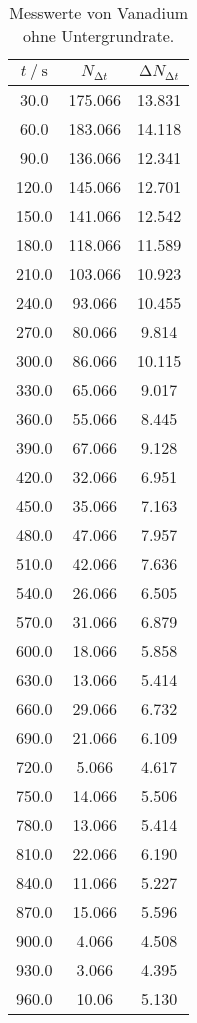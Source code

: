 \begin{table}
 \centering
 \caption{Messwerte von Vanadium ohne Untergrundrate.}
 \label{tab:vanwahr}
 \begin{tabular}{c c c}
  \toprule
  {$t \mathbin{/} \si{\s}$} & {$N_{\increment t}$} & {$\increment N_{\increment t}$}\\
  \midrule
  30.0    & 175.066  & 13.831  \\
  60.0    & 183.066 & 14.118  \\
  90.0    & 136.066  & 12.341  \\
  120.0   & 145.066  & 12.701  \\
  150.0   & 141.066  & 12.542  \\
  180.0   & 118.066  & 11.589  \\
  210.0   & 103.066  & 10.923  \\
  240.0   & 93.066  & 10.455  \\
  270.0   & 80.066  & 9.814  \\
  300.0   & 86.066  & 10.115  \\
  330.0   & 65.066  & 9.017\\
  360.0   & 55.066  & 8.445  \\
  390.0   & 67.066  & 9.128  \\
  420.0   & 32.066  & 6.951  \\
  450.0   & 35.066  & 7.163  \\
  480.0   & 47.066  & 7.957  \\
  510.0   & 42.066  & 7.636  \\
  540.0   & 26.066  & 6.505  \\
  570.0   & 31.066  & 6.879  \\
  600.0   & 18.066  & 5.858  \\
  630.0   & 13.066  & 5.414  \\
  660.0   & 29.066  & 6.732  \\
  690.0   & 21.066  & 6.109  \\
  720.0   & 5.066  & 4.617  \\
  750.0   & 14.066  & 5.506  \\
  780.0   & 13.066  & 5.414  \\
  810.0   & 22.066  & 6.190  \\
  840.0   & 11.066  & 5.227  \\
  870.0   & 15.066  & 5.596  \\
  900.0   & 4.066  & 4.508  \\
  930.0   & 3.066  & 4.395  \\
  960.0   & 10.06  & 5.130  \\

\end{tabular}
\end{table}
